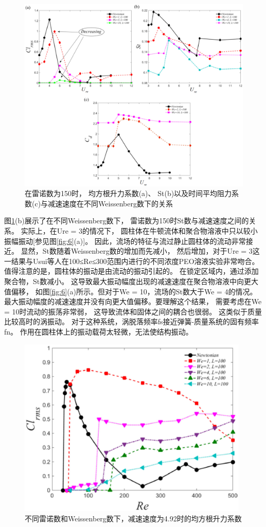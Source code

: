 \documentclass[UTF8,zihao=5]{ctexart} %
\begin{document}
\begin{figure}[H]
    \centering
    \includegraphics[width=12cm]{fig9.jpg}
    \caption{
        在雷诺数为150时，
        均方根升力系数(a)、
        St(b)以及时间平均阻力系数(c)与减速速度在不同Weissenberg数下的关系
    }
    \label{fig:9}
\end{figure}

图\ref{fig:9}(b)展示了在不同Weissenberg数下，
雷诺数为150时St数与减速速度之间的关系。
实际上，在Ure = 3的情况下，
圆柱体在牛顿流体和聚合物溶液中只以较小振幅振动[参见图\ref{fig:6}(a)]。
因此，流场的特征与流过静止圆柱体的流动非常接近。
显然，St数随着Weissenberg数的增加而先减小，
然后增加，对于Ure = 3这一结果与Usui等人在100≤Re≤300范围内进行的不同浓度PEO溶液实验非常吻合。
值得注意的是，圆柱体的振动是由流动的振动引起的。
在锁定区域内，通过添加聚合物，St数减小。
这导致最大振动幅度出现的减速速度在聚合物溶液中向更大值偏移，
如图\ref{fig:6}(a)所示。但对于We = 10，流场的St数大于We = 4的情况。
最大振动幅度的减速速度并没有向更大值偏移。要理解这个结果，
需要考虑在We = 10时流动的振荡非常弱，
这导致流体和固体之间的耦合也很弱。
这类似于质量比较高时的涡振动。
对于这种系统，涡脱落频率fs接近弹簧-质量系统的固有频率fn。
作用在圆柱体上的振动载荷太轻微，无法使结构振动。

\begin{figure}[H]
    \centering
    \includegraphics[width=11cm]{fig10.jpg}
    \caption{
        不同雷诺数和Weissenberg数下，减速速度为4.92时的均方根升力系数
    }
    \label{fig:10}
\end{figure}
\end{document}
